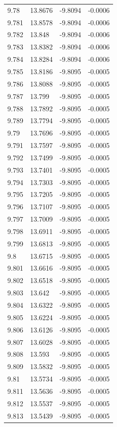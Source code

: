 \begin{tabular}{llll}
9.78 & 13.8676 & -9.8094 & -0.0006 \\
9.781 & 13.8578 & -9.8094 & -0.0006 \\
9.782 & 13.848 & -9.8094 & -0.0006 \\
9.783 & 13.8382 & -9.8094 & -0.0006 \\
9.784 & 13.8284 & -9.8094 & -0.0006 \\
9.785 & 13.8186 & -9.8095 & -0.0005 \\
9.786 & 13.8088 & -9.8095 & -0.0005 \\
9.787 & 13.799 & -9.8095 & -0.0005 \\
9.788 & 13.7892 & -9.8095 & -0.0005 \\
9.789 & 13.7794 & -9.8095 & -0.0005 \\
9.79 & 13.7696 & -9.8095 & -0.0005 \\
9.791 & 13.7597 & -9.8095 & -0.0005 \\
9.792 & 13.7499 & -9.8095 & -0.0005 \\
9.793 & 13.7401 & -9.8095 & -0.0005 \\
9.794 & 13.7303 & -9.8095 & -0.0005 \\
9.795 & 13.7205 & -9.8095 & -0.0005 \\
9.796 & 13.7107 & -9.8095 & -0.0005 \\
9.797 & 13.7009 & -9.8095 & -0.0005 \\
9.798 & 13.6911 & -9.8095 & -0.0005 \\
9.799 & 13.6813 & -9.8095 & -0.0005 \\
9.8 & 13.6715 & -9.8095 & -0.0005 \\
9.801 & 13.6616 & -9.8095 & -0.0005 \\
9.802 & 13.6518 & -9.8095 & -0.0005 \\
9.803 & 13.642 & -9.8095 & -0.0005 \\
9.804 & 13.6322 & -9.8095 & -0.0005 \\
9.805 & 13.6224 & -9.8095 & -0.0005 \\
9.806 & 13.6126 & -9.8095 & -0.0005 \\
9.807 & 13.6028 & -9.8095 & -0.0005 \\
9.808 & 13.593 & -9.8095 & -0.0005 \\
9.809 & 13.5832 & -9.8095 & -0.0005 \\
9.81 & 13.5734 & -9.8095 & -0.0005 \\
9.811 & 13.5636 & -9.8095 & -0.0005 \\
9.812 & 13.5537 & -9.8095 & -0.0005 \\
9.813 & 13.5439 & -9.8095 & -0.0005 \\

\end{tabular}

